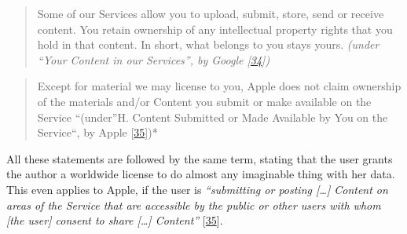 \documentclass[12pt,english,a4paper,titlepage,cleardoublepage=empty,dottedtoc]{report}
\begin{document}
\begin{quote}
Some of our Services allow you to upload, submit, store, send or receive
content. You retain ownership of any intellectual property rights that
you hold in that content. In short, what belongs to you stays yours.
\emph{(under ``Your Content in our Services'', by Google
{[}\protect\hyperlink{ref-web_2016_google_terms-of-service}{34}{]})}
\end{quote}

\begin{quote}
Except for material we may license to you, Apple does not claim
ownership of the materials and/or Content you submit or make available
on the Service ``(under''H. Content Submitted or Made Available by You
on the Service``, by Apple
{[}\protect\hyperlink{ref-web_2016_apple-icloud_terms-of-service}{35}{]})*
\end{quote}

All these statements are followed by the same term, stating that the
user grants the author a worldwide license to do almost any imaginable
thing with her data. This even applies to Apple, if the user is
\emph{``submitting or posting {[}\ldots{}{]} Content on areas of the
Service that are accessible by the public or other users with whom
{[}the user{]} consent to share {[}\ldots{}{]} Content''}
{[}\protect\hyperlink{ref-web_2016_apple-icloud_terms-of-service}{35}{]}.
\end{document}
